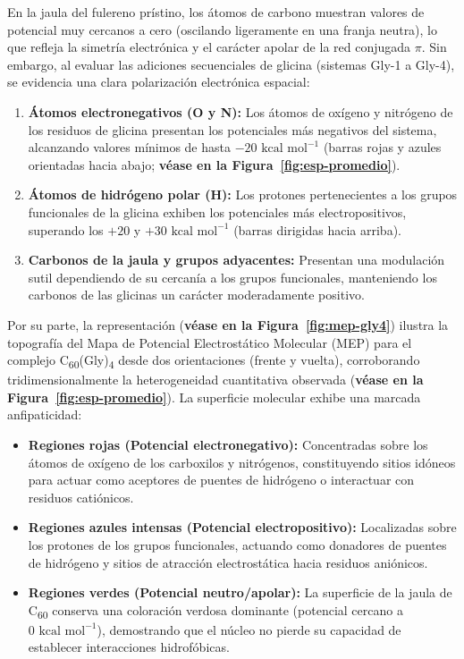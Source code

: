 En la jaula del fulereno prístino, los átomos de carbono muestran valores de potencial muy cercanos a cero (oscilando ligeramente en una franja neutra), lo que refleja la simetría electrónica y el carácter apolar de la red conjugada $\pi$. Sin embargo, al evaluar las adiciones secuenciales de glicina (sistemas Gly-1 a Gly-4), se evidencia una clara polarización electrónica espacial:
\begin{enumerate}
    \item \textbf{Átomos electronegativos (O y N):} Los átomos de oxígeno y nitrógeno de los residuos de glicina presentan los potenciales más negativos del sistema, alcanzando valores mínimos de hasta $-20\text{ kcal mol}^{-1}$ (barras rojas y azules orientadas hacia abajo; \textbf{véase en la Figura~\ref{fig:esp-promedio}}).
    \item \textbf{Átomos de hidrógeno polar (H):} Los protones pertenecientes a los grupos funcionales de la glicina exhiben los potenciales más electropositivos, superando los $+20$ y $+30\text{ kcal mol}^{-1}$ (barras dirigidas hacia arriba).
    \item \textbf{Carbonos de la jaula y grupos adyacentes:} Presentan una modulación sutil dependiendo de su cercanía a los grupos funcionales, manteniendo los carbonos de las glicinas un carácter moderadamente positivo.
\end{enumerate}

Por su parte, la representación (\textbf{véase en la Figura~\ref{fig:mep-gly4}}) ilustra la topografía del Mapa de Potencial Electrostático Molecular (MEP) para el complejo C\textsubscript{60}(Gly)\textsubscript{4} desde dos orientaciones (frente y vuelta), corroborando tridimensionalmente la heterogeneidad cuantitativa observada (\textbf{véase en la Figura~\ref{fig:esp-promedio}}). La superficie molecular exhibe una marcada anfipaticidad:
\begin{itemize}
    \item \textbf{Regiones rojas (Potencial electronegativo):} Concentradas sobre los átomos de oxígeno de los carboxilos y nitrógenos, constituyendo sitios idóneos para actuar como aceptores de puentes de hidrógeno o interactuar con residuos catiónicos.
    \item \textbf{Regiones azules intensas (Potencial electropositivo):} Localizadas sobre los protones de los grupos funcionales, actuando como donadores de puentes de hidrógeno y sitios de atracción electrostática hacia residuos aniónicos.
    \item \textbf{Regiones verdes (Potencial neutro/apolar):} La superficie de la jaula de C\textsubscript{60} conserva una coloración verdosa dominante (potencial cercano a $0\text{ kcal mol}^{-1}$), demostrando que el núcleo no pierde su capacidad de establecer interacciones hidrofóbicas.
\end{itemize}

